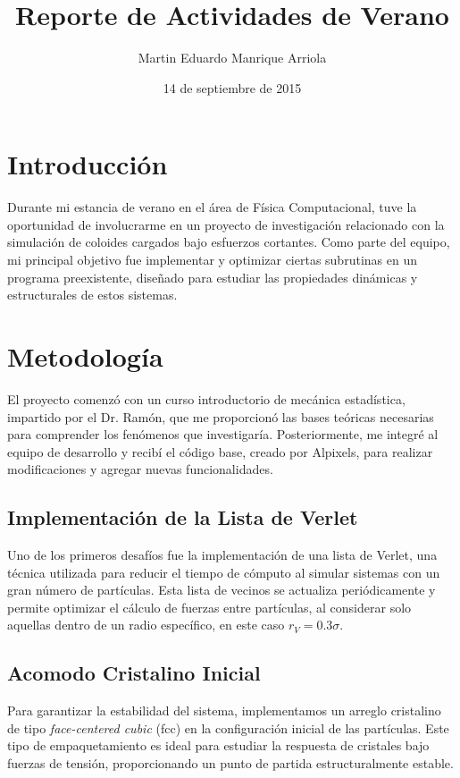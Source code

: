 \documentclass[12pt,spanish,twocolumn]{article}
\title{Reporte de Actividades de Verano}
\author{Martin Eduardo Manrique Arriola}
\date{14 de septiembre de 2015}
\begin{document}
\maketitle

\section*{Introducción}

Durante mi estancia de verano en el área de Física Computacional, tuve la oportunidad de involucrarme en un proyecto de investigación relacionado con la simulación de coloides cargados bajo esfuerzos cortantes. Como parte del equipo, mi principal objetivo fue implementar y optimizar ciertas subrutinas en un programa preexistente, diseñado para estudiar las propiedades dinámicas y estructurales de estos sistemas.

\section*{Metodología}

El proyecto comenzó con un curso introductorio de mecánica estadística, impartido por el Dr. Ramón, que me proporcionó las bases teóricas necesarias para comprender los fenómenos que investigaría. Posteriormente, me integré al equipo de desarrollo y recibí el código base, creado por Alpixels, para realizar modificaciones y agregar nuevas funcionalidades.

\subsection*{Implementación de la Lista de Verlet}

Uno de los primeros desafíos fue la implementación de una lista de Verlet, una técnica utilizada para reducir el tiempo de cómputo al simular sistemas con un gran número de partículas. Esta lista de vecinos se actualiza periódicamente y permite optimizar el cálculo de fuerzas entre partículas, al considerar solo aquellas dentro de un radio específico, en este caso $r_{V} = 0.3\sigma$.

\subsection*{Acomodo Cristalino Inicial}

Para garantizar la estabilidad del sistema, implementamos un arreglo cristalino de tipo \textit{face-centered cubic} (fcc) en la configuración inicial de las partículas. Este tipo de empaquetamiento es ideal para estudiar la respuesta de cristales bajo fuerzas de tensión, proporcionando un punto de partida estructuralmente estable.
\end{document}
